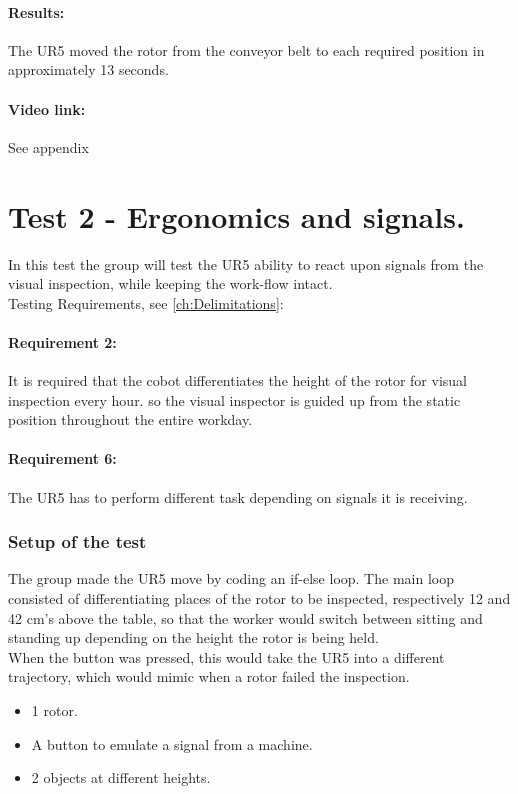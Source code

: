 \paragraph{Results:}
The UR5 moved the rotor from the conveyor belt to each required position in approximately 13 seconds. 

\paragraph{Video link: }
See appendix \cite{testfilm}


\section{Test 2 - Ergonomics and signals.}

In this test the group will test the UR5 ability to react upon signals from the visual inspection, while keeping the work-flow intact.\\
Testing Requirements, see \ref{ch:Delimitations}:

\paragraph{Requirement 2:} It is required that the cobot differentiates the height of the rotor for visual inspection every hour. so the visual inspector is guided up from the static position throughout the entire workday.
\paragraph{Requirement 6:} The UR5 has to perform different task depending on signals it is receiving.
\subsubsection{Setup of the test}

The group made the UR5 move by coding an if-else loop. The main loop consisted of differentiating places of the rotor to be inspected, respectively 12 and 42 cm's above the table, so that the worker would switch between sitting and standing up depending on the height the rotor is being held.\\
When the button was pressed, this would take the UR5 into a different trajectory, which would mimic when a rotor failed the inspection.

\begin{itemize}
    \item 1  rotor.
    \item A button to emulate a signal from a machine.
    \item 2 objects at different heights. 
\end{itemize}

